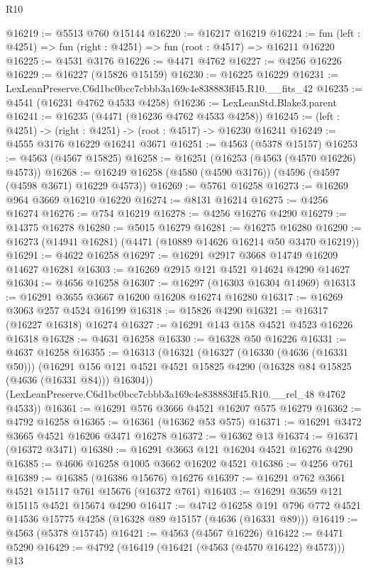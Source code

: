 \begin{lexlean}{R10}
\begin{coremodule}
@16219 := @5513 @760 @15144
@16220 := @16217 @16219
@16224 := fun (left : @4251) => fun (right : @4251) => fun (root : @4517) => @16211 @16220
@16225 := @4531 @3176
@16226 := @4471 @4762
@16227 := @4256 @16226
@16229 := @16227 (@15826 @15159)
@16230 := @16225 @16229
@16231 := LexLeanPreserve.C6d1bc0bcc7cbbb3a169c4e838883ff45.R10.__fits_42
@16235 := @4541 (@16231 @4762 @4533 @4258)
@16236 := LexLeanStd.Blake3.parent
@16241 := @16235 (@4471 (@16236 @4762 @4533 @4258))
@16245 := (left : @4251) -> (right : @4251) -> (root : @4517) -> @16230 @16241
@16249 := @4555 @3176 @16229 @16241 @3671
@16251 := @4563 (@5378 @15157)
@16253 := @4563 (@4567 @15825)
@16258 := @16251 (@16253 (@4563 (@4570 @16226) @4573))
@16268 := @16249 @16258 (@4580 (@4590 @3176)) (@4596 (@4597 (@4598 @3671) @16229 @4573))
@16269 := @5761 @16258
@16273 := @16269 @964 @3669 @16210 @16220
@16274 := @8131 @16214
@16275 := @4256 @16274
@16276 := @754 @16219
@16278 := @4256 @16276 @4290
@16279 := @14375 @16278
@16280 := @5015 @16279
@16281 := @16275 @16280
@16290 := @16273 (@14941 @16281) (@4471 (@10889 @14626 @16214 @50 @3470 @16219))
@16291 := @4622 @16258
@16297 := @16291 @2917 @3668 @14749 @16209 @14627 @16281
@16303 := @16269 @2915 @121 @4521 @14624 @4290 @14627
@16304 := @4656 @16258
@16307 := @16297 (@16303 @16304 @14969)
@16313 := @16291 @3655 @3667 @16200 @16208 @16274 @16280
@16317 := @16269 @3063 @257 @4524 @16199
@16318 := @15826 @4290
@16321 := @16317 (@16227 @16318) @16274
@16327 := @16291 @143 @158 @4521 @4523 @16226 @16318
@16328 := @4631 @16258
@16330 := @16328 @50 @16226
@16331 := @4637 @16258
@16355 := @16313
    (@16321
      (@16327
        (@16330 (@4636 (@16331 @50)))
        (@16291 @156 @121 @4521 @4521 @15825 @4290 (@16328 @84 @15825 (@4636 (@16331 @84))) @16304))
      (LexLeanPreserve.C6d1bc0bcc7cbbb3a169c4e838883ff45.R10.__rel_48 @4762 @4533))
@16361 := @16291 @576 @3666 @4521 @16207 @575 @16279
@16362 := @4792 @16258
@16365 := @16361 (@16362 @53 @575)
@16371 := @16291 @3472 @3665 @4521 @16206 @3471 @16278
@16372 := @16362 @13
@16374 := @16371 (@16372 @3471)
@16380 := @16291 @3663 @121 @16204 @4521 @16276 @4290
@16385 := @4606 @16258 @1005 @3662 @16202 @4521
@16386 := @4256 @761
@16389 := @16385 (@16386 @15676) @16276
@16397 := @16291 @762 @3661 @4521 @15117 @761 @15676 (@16372 @761)
@16403 := @16291 @3659 @121 @15115 @4521 @15674 @4290
@16417 := @4742
    @16258
    @191
    @796
    @772
    @4521
    @14536
    @15775
    @4258
    (@16328 @89 @15157 (@4636 (@16331 @89)))
@16419 := @4563 (@5378 @15745)
@16421 := @4563 (@4567 @16226)
@16422 := @4471 @5290
@16429 := @4792 (@16419 (@16421 (@4563 (@4570 @16422) @4573))) @13

\end{coremodule}
\end{lexlean}

